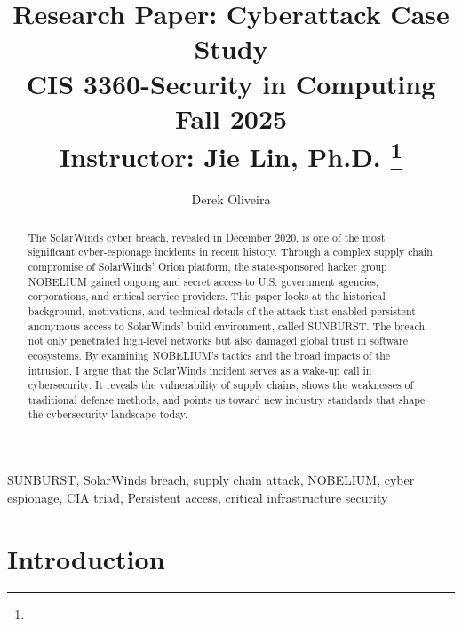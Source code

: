 \documentclass[conference]{IEEEtran}
\begin{document}
\title{Research Paper: Cyberattack Case Study \\CIS 3360-Security in Computing\\Fall 2025\\
{\footnotesize Instructor: Jie Lin, Ph.D.}
\thanks{}
}

\author{{ Derek Oliveira}\\
}

\maketitle

\begin{abstract}
The SolarWinds cyber breach, revealed in December 2020, is one of the most significant cyber-espionage incidents in recent history. 
Through a complex supply chain compromise of SolarWinds’ Orion platform, the state-sponsored hacker group NOBELIUM gained ongoing and 
secret access to U.S. government agencies, corporations, and critical service providers. This paper looks at the historical background,
 motivations, and technical details of the attack that enabled persistent anonymous access to SolarWinds’ build environment, called SUNBURST.
  The breach not only penetrated high-level networks but also damaged global trust in software ecosystems. By examining NOBELIUM’s tactics and 
  the broad impacts of the intrusion, I argue that the SolarWinds incident serves as a wake-up call in cybersecurity. It reveals the vulnerability 
  of supply chains, shows the weaknesses of traditional defense methods, and points us toward new industry standards that shape the cybersecurity 
  landscape today.
\end{abstract}

\begin{IEEEkeywords}
SUNBURST, SolarWinds breach, supply chain attack, NOBELIUM, cyber espionage, CIA triad, Persistent access, critical infrastructure security
\end{IEEEkeywords}

\section{Introduction}

\end{document}
